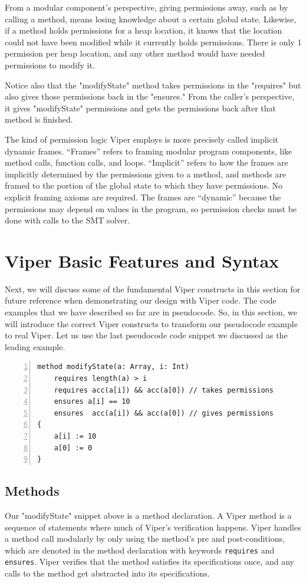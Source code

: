 \documentclass[msc,oneside]{ubcthesis}
\begin{document}
From a modular component's perspective, giving permissions away, such as by calling a method, means losing knowledge about a certain global state. Likewise, if a method holds permissions for a heap location, it knows that the location could not have been modified while it currently holds permissions. There is only 1 permission per heap location, and any other method would have needed permissions to modify it. 

Notice also that the "modifyState" method takes permissions in the "requires" but also gives those permissions back in the "ensures." From the caller's perspective, it gives "modifyState" permissions and gets the permissions back after that method is finished.

The kind of permission logic Viper employs is more precisely called implicit dynamic frames. ``Frames'' refers to framing modular program components, like method calls, function calls, and loops. ``Implicit'' refers to how the frames are implicitly determined by the permissions given to a method, and methods are framed to the portion of the global state to which they have permissions. No explicit framing axioms are required. The frames are ``dynamic'' because the permissions may depend on values in the program, so permission checks must be done with calls to the SMT solver.

\section{Viper Basic Features and Syntax}
Next, we will discuss some of the fundamental Viper constructs in this section for future reference when demonstrating our design with Viper code. The code examples that we have described so far are in pseudocode. So, in this section, we will introduce the correct Viper constructs to transform our pseudocode example to real Viper. Let us use the last pseudocode code snippet we discussed as the leading example.

\begin{lstlisting}[language=silver,numbers=left, firstnumber=1, stepnumber=1]
method modifyState(a: Array, i: Int)
    requires length(a) > i
    requires acc(a[i]) && acc(a[0]) // takes permissions
    ensures a[i] == 10
    ensures  acc(a[i]) && acc(a[0]) // gives permissions
{
    a[i] := 10
    a[0] := 0
}
\end{lstlisting}

\subsection{Methods}
Our "modifyState" snippet above is a method declaration. A Viper method is a sequence of statements where much of Viper's verification happens. Viper handles a method call modularly by only using the method's pre and post-conditions, which are denoted in the method declaration with keywords \lstinline{requires} and \lstinline{ensures}. Viper verifies that the method satisfies its specifications once, and any calls to the method get abstracted into its specifications.
\end{document}
